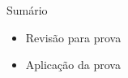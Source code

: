 
\begin{frame}{Sumário}
    \begin{itemize}
        \item Revisão para prova
        \item Aplicação da prova
    \end{itemize}
\end{frame}
